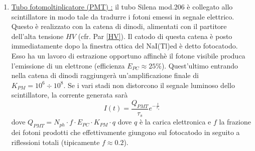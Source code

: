 \documentclass[12pt,a4paper,openright,twoside]{article}
\numberwithin{equation}{section} %
\begin{document}
\begin{enumerate}
\begin{enumerate}
\end{enumerate}

I processi (a), (b), (c) sono fra loro concorrenti, la rispettiva sezione d'urto è fortemente dipendente dall'energia del raggio-$\gamma$ incidente e è riportata in  Fig. \ref{sezione}.

\begin{figure}[hbtp]
\centering
\texttt{[image: immagini/section.jpg]}
\caption{Sezione d'urto raggi$\gamma$-$e^-$ per NaI(Tl)}
\label{sezione}
\end{figure}

L'intervallo da tenere in considerazione per la seguente esperienza è $10^5 \div 10^6 keV$. Qui si nota che la produzione di coppie è praticamente nulla. L'effetto Compton ha in generale maggiore probabilità dell'effetto PE. Tuttavia si osserva sperimentalmente un fotopicco molto più alto del \textit{rettangolo Compton}, questo è dovuto al fatto che il fotone uscente da un urto compton può di nuovo fare nell'istante successivo un nuovo urto Compton : i fotoni visibili verranno "letti contemporaneamente" e "confusi" con un evento PE.
Un fenomeno analogo accade anche per le varie combinazioni di picchi (e.g. il doppietto del $\ce{^{60}_{}Co}$) dando origine al cosiddetto \textbf{picco-somma}.

\item \label{PMT}\underline{Tubo fotomoltiplicatore (PMT) :} il tubo Silena mod.206 è collegato allo scintillatore in modo tale da tradurre i fotoni emessi in segnale elettrico. Questo è realizzato con la catena di dinodi, alimentati con il partitore dell'alta tensione $HV$ (cfr. Par \ref{HV}). Il catodo di questa catena è posto immediatamente dopo la finestra ottica del NaI(Tl)ed è detto fotocatodo. Esso ha un lavoro di estrazione opportuno affinchè il fotone visibile produca l'emissione di un elettrone (efficienza $E_{PC} \approx 25 \% $). Quest'ultimo entrando nella catena di dinodi raggiungerà un'amplificazione finale di $K_{PM} = 10^6 \div 10^8 $. Se i vari stadi non distorcono il segnale luminoso dello scintillatore, la corrente generata sarà 
\begin{equation}
I(t)=\frac{Q_{PMT}}{\tau_{s}}e^{- \frac{t}{\tau_{s}}}
\end{equation}
dove $Q_{PMT}=N_{ph}\cdot f \cdot E_{PC} \cdot K_{PM} \cdot q$ dove $q$ è la carica elettronica e $f$ la frazione dei fotoni prodotti che effettivamente giungono sul fotocatodo in seguito a riflessioni totali (tipicamente $f \approx 0.2$).


\end{enumerate}
\end{document}
